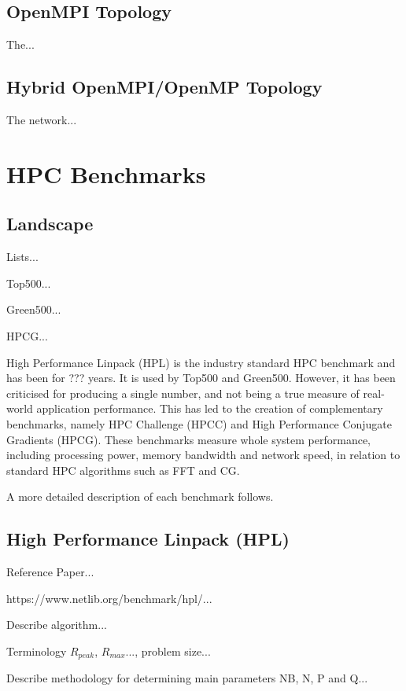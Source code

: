 \documentclass{report}
\begin{document}
%
%
\section{OpenMPI Topology}

The...


%
%
\section{Hybrid OpenMPI/OpenMP Topology}

The network...



%
%
\chapter{HPC Benchmarks}

\section{Landscape}

Lists... 

Top500...

Green500...

HPCG...


High Performance Linpack (HPL) is the industry standard HPC benchmark and has been for ??? years. It is used by Top500 and Green500. However, it has been criticised for producing a single number, and not being a true measure of real-world application performance. This has led to the creation of complementary benchmarks, namely HPC Challenge (HPCC) and High Performance Conjugate Gradients (HPCG). These benchmarks measure whole system performance, including processing power, memory bandwidth and network speed, in relation to standard HPC algorithms such as FFT and CG.

A more detailed description of each benchmark follows. 


%
%
\section{High Performance Linpack (HPL)}

Reference Paper...

https://www.netlib.org/benchmark/hpl/...

Describe algorithm...

Terminology $R_{peak}$, $R_{max}$..., problem size...

Describe methodology for determining main parameters NB, N, P and Q...
\end{document}
